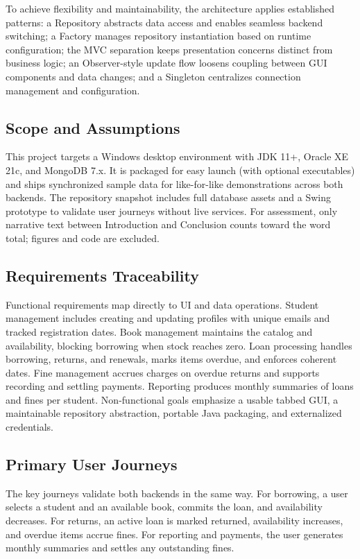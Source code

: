 \documentclass[12pt,a4paper]{article}
\begin{document}
To achieve flexibility and maintainability, the architecture applies established patterns: a Repository abstracts data access and enables seamless backend switching; a Factory manages repository instantiation based on runtime configuration; the MVC separation keeps presentation concerns distinct from business logic; an Observer-style update flow loosens coupling between GUI components and data changes; and a Singleton centralizes connection management and configuration.

\subsection{Scope and Assumptions}

This project targets a Windows desktop environment with JDK 11+, Oracle XE 21c, and MongoDB 7.x. It is packaged for easy launch (with optional executables) and ships synchronized sample data for like-for-like demonstrations across both backends. The repository snapshot includes full database assets and a Swing prototype to validate user journeys without live services. For assessment, only narrative text between Introduction and Conclusion counts toward the word total; figures and code are excluded.

\subsection{Requirements Traceability}

Functional requirements map directly to UI and data operations. Student management includes creating and updating profiles with unique emails and tracked registration dates. Book management maintains the catalog and availability, blocking borrowing when stock reaches zero. Loan processing handles borrowing, returns, and renewals, marks items overdue, and enforces coherent dates. Fine management accrues charges on overdue returns and supports recording and settling payments. Reporting produces monthly summaries of loans and fines per student. Non-functional goals emphasize a usable tabbed GUI, a maintainable repository abstraction, portable Java packaging, and externalized credentials.

\subsection{Primary User Journeys}

The key journeys validate both backends in the same way. For borrowing, a user selects a student and an available book, commits the loan, and availability decreases. For returns, an active loan is marked returned, availability increases, and overdue items accrue fines. For reporting and payments, the user generates monthly summaries and settles any outstanding fines.
\end{document}

